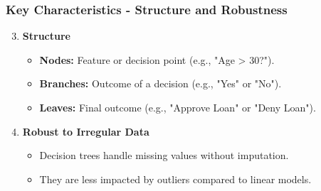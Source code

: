 \documentclass[aspectratio=169]{beamer}
\begin{document}
\begin{frame}[fragile]
    \frametitle{Key Characteristics - Structure and Robustness}
    \begin{enumerate}
        \setcounter{enumi}{2} %
        \item \textbf{Structure}
            \begin{itemize}
                \item \textbf{Nodes:} Feature or decision point (e.g., "Age > 30?").
                \item \textbf{Branches:} Outcome of a decision (e.g., "Yes" or "No").
                \item \textbf{Leaves:} Final outcome (e.g., "Approve Loan" or "Deny Loan").
            \end{itemize}

        \item \textbf{Robust to Irregular Data}
            \begin{itemize}
                \item Decision trees handle missing values without imputation.
                \item They are less impacted by outliers compared to linear models.
            \end{itemize}
    \end{enumerate}
\end{frame}

\end{document}
